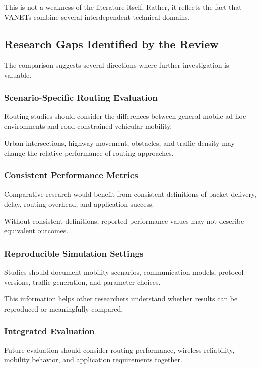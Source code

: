 This is not a
weakness of the
literature itself.
Rather, it reflects
the fact that VANETs
combine several
interdependent
technical domains.

\subsection{Research Gaps Identified by the Review}

The comparison suggests
several directions
where further
investigation is
valuable.

\subsubsection{Scenario-Specific Routing Evaluation}

Routing studies should
consider the differences
between general mobile
ad hoc environments
and road-constrained
vehicular mobility.

Urban intersections,
highway movement,
obstacles, and
traffic density
may change the
relative performance
of routing approaches.

\subsubsection{Consistent Performance Metrics}

Comparative research
would benefit from
consistent definitions
of packet delivery,
delay, routing overhead,
and application success.

Without consistent
definitions, reported
performance values
may not describe
equivalent outcomes.

\subsubsection{Reproducible Simulation Settings}

Studies should document
mobility scenarios,
communication models,
protocol versions,
traffic generation,
and parameter choices.

This information
helps other researchers
understand whether
results can be
reproduced or
meaningfully compared.

\subsubsection{Integrated Evaluation}

Future evaluation
should consider
routing performance,
wireless reliability,
mobility behavior,
and application
requirements together.

